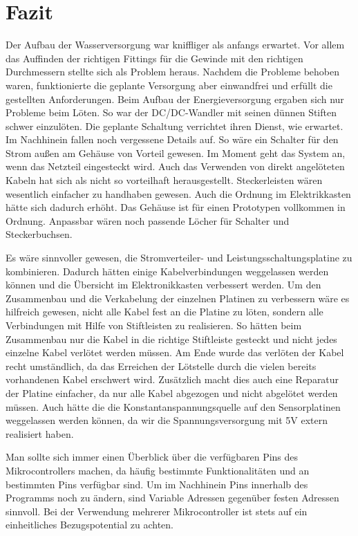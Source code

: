 \newpage
\fancyhf{}
\section{Fazit}
Der Aufbau der Wasserversorgung war kniffliger als anfangs erwartet. Vor allem das
Auffinden der richtigen Fittings für die Gewinde mit den richtigen Durchmessern
stellte sich als Problem heraus. Nachdem die Probleme behoben waren,
funktionierte die geplante Versorgung aber einwandfrei und erfüllt die gestellten Anforderungen. 
Beim Aufbau der Energieversorgung ergaben sich nur Probleme beim Löten. So war der DC/DC-Wandler
mit seinen dünnen Stiften schwer einzulöten. Die geplante Schaltung verrichtet ihren Dienst, wie
erwartet. Im Nachhinein fallen noch
vergessene Details auf. So wäre ein Schalter für den Strom außen am Gehäuse von Vorteil gewesen.
Im Moment geht das System an, wenn das Netzteil eingesteckt wird. Auch das Verwenden von direkt
angelöteten Kabeln hat sich als nicht so
vorteilhaft herausgestellt. Steckerleisten wären wesentlich einfacher zu handhaben gewesen. Auch
die Ordnung im Elektrikkasten hätte sich dadurch erhöht.
Das Gehäuse ist für einen Prototypen vollkommen in Ordnung. Anpassbar wären noch passende Löcher
für Schalter und Steckerbuchsen.

Es  wäre  sinnvoller  gewesen,  die  Stromverteiler-  und
Leistungsschaltungsplatine  zu  kombinieren.  Dadurch  hätten  einige
Kabelverbindungen  weggelassen  werden  können  und  die  Übersicht
im  Elektronikkasten  verbessert  werden.  Um  den  Zusammenbau  und
die  Verkabelung  der  einzelnen  Platinen  zu  verbessern  wäre  es
hilfreich  gewesen,  nicht  alle  Kabel  fest  an  die  Platine  zu  löten,
sondern  alle  Verbindungen  mit  Hilfe  von  Stiftleisten  zu  realisieren.
So  hätten  beim  Zusammenbau  nur  die  Kabel  in  die  richtige  Stiftleiste
gesteckt  und  nicht  jedes  einzelne  Kabel  verlötet  werden  müssen.  Am
Ende  wurde  das  verlöten  der  Kabel  recht  umständlich,  da  das  Erreichen
der  Lötstelle  durch  die  vielen  bereits  vorhandenen  Kabel  erschwert  wird.
Zusätzlich  macht  dies  auch  eine  Reparatur  der  Platine  einfacher,  da  nur
alle  Kabel  abgezogen  und  nicht  abgelötet  werden  müssen.  Auch  hätte  die
die  Konstantanspannungsquelle  auf  den  Sensorplatinen  weggelassen  werden
können,  da  wir  die  Spannungsversorgung  mit  5V  extern  realisiert  haben.

Man sollte sich immer einen Überblick über die verfügbaren Pins des
Mikrocontrollers machen, da häufig bestimmte Funktionalitäten und an
bestimmten Pins verfügbar sind. Um im Nachhinein Pins innerhalb des Programms
noch zu ändern, sind Variable Adressen gegenüber festen Adressen sinnvoll.
Bei der Verwendung mehrerer Mikrocontroller ist stets auf ein einheitliches
Bezugspotential zu achten.

